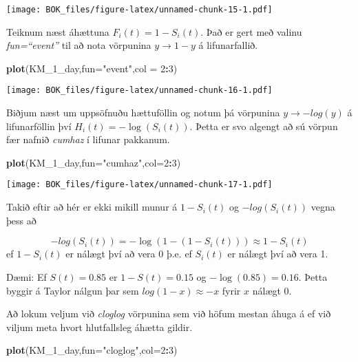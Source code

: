 \documentclass[
]{book}
\newenvironment{Shaded}{\begin{snugshade}}{\end{snugshade}}
\newcommand{\DataTypeTok}[1]{\textcolor[rgb]{0.13,0.29,0.53}{#1}}
\newcommand{\DecValTok}[1]{\textcolor[rgb]{0.00,0.00,0.81}{#1}}
\newcommand{\KeywordTok}[1]{\textcolor[rgb]{0.13,0.29,0.53}{\textbf{#1}}}
\newcommand{\NormalTok}[1]{#1}
\newcommand{\OperatorTok}[1]{\textcolor[rgb]{0.81,0.36,0.00}{\textbf{#1}}}
\newcommand{\StringTok}[1]{\textcolor[rgb]{0.31,0.60,0.02}{#1}}
\begin{document}
\texttt{[image: BOK\_files/figure-latex/unnamed-chunk-15-1.pdf]}

Teiknum næst áhættuna \(F_i(t)=1-S_i(t)\). Það er gert með valinu \emph{fun=``event''} til að nota vörpunina \(y \to 1-y\) á lifunarfallið.

\begin{Shaded}
\begin{Highlighting}[]
\KeywordTok{plot}\NormalTok{(KM\_}\DecValTok{1}\NormalTok{\_day,}\DataTypeTok{fun=}\StringTok{"event"}\NormalTok{,}\DataTypeTok{col =} \DecValTok{2}\OperatorTok{:}\DecValTok{3}\NormalTok{)}
\end{Highlighting}
\end{Shaded}

\texttt{[image: BOK\_files/figure-latex/unnamed-chunk-16-1.pdf]}

Biðjum næst um uppsöfnuðu hættuföllin og notum þá vörpunina \(y \to -log(y)\) á lifunarföllin því \(H_i(t) = -\log(S_i(t))\). Þetta er svo algengt að sú vörpun fær nafnið \emph{cumhaz} í lifunar pakkanum.

\begin{Shaded}
\begin{Highlighting}[]
\KeywordTok{plot}\NormalTok{(KM\_}\DecValTok{1}\NormalTok{\_day,}\DataTypeTok{fun=}\StringTok{"cumhaz"}\NormalTok{,}\DataTypeTok{col=}\DecValTok{2}\OperatorTok{:}\DecValTok{3}\NormalTok{)}
\end{Highlighting}
\end{Shaded}

\texttt{[image: BOK\_files/figure-latex/unnamed-chunk-17-1.pdf]}

Takið eftir að hér er ekki mikill munur á \(1-S_i(t)\) og \(-log(S_i(t))\) vegna þess að

\[
-log(S_i(t))=-\log(1-(1-S_i(t))) \approx 1-S_i(t)
\]
ef \(1-S_i(t)\) er nálægt því að vera 0 þ.e. ef \(S_i(t)\) er nálægt því að vera 1.

Dæmi: Ef \(S(t)=0.85\) er \(1-S(t)=0.15\) og \(-\log(0.85)=0.16\). Þetta byggir á Taylor nálgun þar sem \(log(1-x) \approx -x\) fyrir \(x\) nálægt 0.

Að lokum veljum við \emph{cloglog} vörpunina sem við höfum mestan áhuga á ef við viljum meta hvort hlutfallsleg áhætta gildir.

\begin{Shaded}
\begin{Highlighting}[]
\KeywordTok{plot}\NormalTok{(KM\_}\DecValTok{1}\NormalTok{\_day,}\DataTypeTok{fun=}\StringTok{"cloglog"}\NormalTok{,}\DataTypeTok{col=}\DecValTok{2}\OperatorTok{:}\DecValTok{3}\NormalTok{)}
\end{Highlighting}
\end{Shaded}
\end{document}
